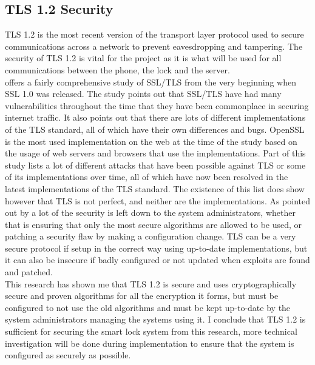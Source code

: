 \documentclass[10pt, a4paper]{article}
\begin{document}
\subsection{TLS 1.2 Security}
TLS 1.2 is the most recent version of the transport layer protocol used to secure communications across a network to prevent eavesdropping and tampering. The security of TLS 1.2 is vital for the project as it is what will be used for all communications between the phone, the lock and the server.
\\
\indent\cite{Meyer2014} offers a fairly comprehensive study of SSL/TLS from the very beginning when SSL 1.0 was released. The study points out that SSL/TLS have had many vulnerabilities throughout the time that they have been commonplace in securing internet traffic. It also points out that there are lots of different implementations of the TLS standard, all of which have their own differences and bugs. OpenSSL is the most used implementation on the web at the time of the study based on the usage of web servers and browsers that use the implementations. Part of this study lists a lot of different attacks that have been possible against TLS or some of its implementations over time, all of which have now been resolved in the latest implementations of the TLS standard. The existence of this list does show however that TLS is not perfect, and neither are the implementations. As pointed out by \cite{Turner2014} a lot of the security is left down to the system administrators, whether that is ensuring that only the most secure algorithms are allowed to be used, or patching a security flaw by making a configuration change. TLS can be a very secure protocol if setup in the correct way using up-to-date implementations, but it can also be insecure if badly configured or not updated when exploits are found and patched.
\\
\indent This research has shown me that TLS 1.2 is secure and uses cryptographically secure and proven algorithms for all the encryption it forms, but must be configured to not use the old algorithms and must be kept up-to-date by the system administrators managing the systems using it. I conclude that TLS 1.2 is sufficient for securing the smart lock system from this research, more technical investigation will be done during implementation to ensure that the system is configured as securely as possible.
\end{document}
